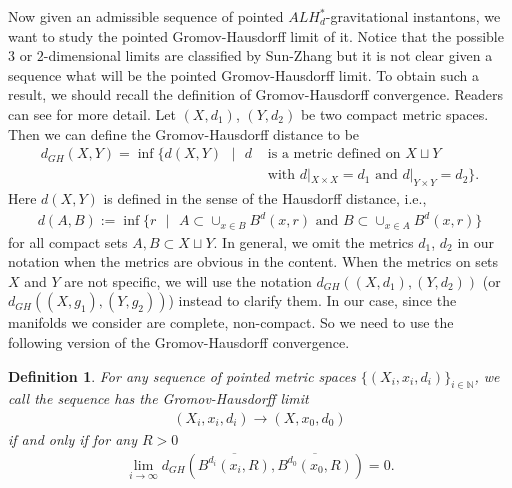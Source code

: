 \documentclass[11pt]{amsart}
\theoremstyle{plain}
\newtheorem{defn}[thm]{Definition}
\theoremstyle{definition}
\numberwithin{equation}{section}
\begin{document}
%
%
 
  Now given an admissible sequence of pointed $ALH^*_d$-gravitational instantons, we want to study the pointed Gromov-Hausdorff limit of it. Notice that the possible $3$ or $2$-dimensional limits are classified by Sun-Zhang \cite[Theorem 4.4, Theorem 5.5]{SZ} but it is not clear given a sequence what will be the pointed Gromov-Hausdorff limit. 
 To obtain such a result, we should recall the definition of Gromov-Hausdorff convergence. Readers can see \cite{P} for more detail. Let $(X, d_1)$, $(Y, d_2)$ be two compact metric spaces. Then we can define the Gromov-Hausdorff distance to be
 \begin{align}
 	d_{GH}(X,Y)=\inf\Big\{d(X,Y)\mbox{ }\Big|\mbox{ }d&\mbox{ is a metric defined on }X\sqcup Y\\
 	&\mbox{ with }d|_{X\times X}=d_1\mbox{ and }d|_{Y\times Y}=d_2\Big\}.\nonumber
 \end{align}
 Here $d(X,Y)$ is defined in the sense of the Hausdorff distance, i.e.,
 \begin{align}
 	d(A,B):=\inf \big\{r\mbox{ }\big|\mbox{ }A\subset \cup_{x\in B}B^d(x,r)\mbox{ and } B\subset \cup_{x\in A}B^d(x,r) \big\}
 \end{align}
 for all compact sets $A,B\subset X\sqcup Y$. In general, we omit the metrics $d_1$, $d_2$ in our notation when the metrics are obvious in the content. When the metrics on sets $X$ and $Y$ are not specific, we will use the notation $d_{GH}((X,d_1),(Y,d_2))$ (or $d_{GH}((X,g_1),(Y,g_2))$) instead to clarify them. In our case, since the manifolds we consider are complete, non-compact. So we need to use the following version of the Gromov-Hausdorff convergence.
 \begin{defn}
 	For any sequence of pointed metric spaces $\{(X_i,x_i, d_i)\}_{i\in\mathbb{N}}$, we call the sequence has the Gromov-Hausdorff limit
 	\begin{align}
 		(X_i,x_i, d_i)\rightarrow (X,x_0,d_0)
 	\end{align}
 	if and only if for any $R>0$
 	\begin{align}
 		\lim_{i\rightarrow \infty}d_{GH}(\overline{B^{d_i}(x_i, R)},\overline{B^{d_0}(x_0,R)})=0.
 	\end{align}
 \end{defn}
\end{document}
